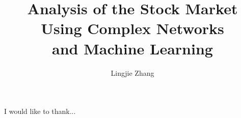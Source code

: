 \documentclass[12pt,MSc,wordcount,twoside]{muthesis}
\begin{document}

\title{Analysis of the Stock Market\\
  Using Complex Networks\\
  and Machine Learning}
\author{Lingjie Zhang}

\beforeabstract



\afterabstract

I would like to thank...
\afterpreface

\tableofcontents









% 





\appendix

\end{document}
